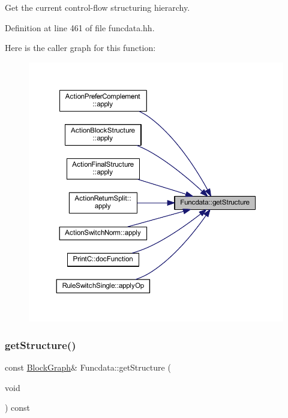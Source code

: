 Get the current control-\/flow structuring hierarchy. 



Definition at line 461 of file funcdata.\+hh.

Here is the caller graph for this function\+:
\nopagebreak
\begin{figure}[H]
\begin{center}
\leavevmode
\includegraphics[width=350pt]{class_funcdata_a8010b1f0044fd3a03f8f717279ffc0b1_icgraph}
\end{center}
\end{figure}
\mbox{\label{class_funcdata_a036b9724068d4c5b319858e98854f31c}} 
\subsubsection{\texorpdfstring{getStructure()}{getStructure()}\hspace{0.1cm}{\footnotesize\ttfamily [2/2]}}
{\footnotesize\ttfamily const \mbox{\hyperlink{class_block_graph}{Block\+Graph}}\& Funcdata\+::get\+Structure (\begin{DoxyParamCaption}\item[{void}]{ }\end{DoxyParamCaption}) const\hspace{0.3cm}{\ttfamily [inline]}}




